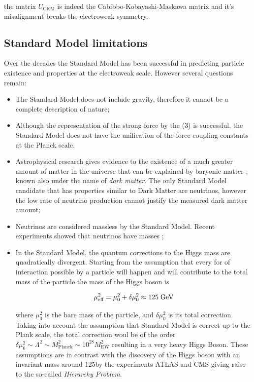the matrix $U_{\text{CKM}}$ is indeed the Cabibbo-Kobayashi-Maskawa matrix and it's misalignment breaks the electroweak symmetry.

\subsection{Standard Model limitations}

Over the decades the Standard Model has been successful in predicting particle existence and properties at the electroweak scale. However several questions remain:

\begin{itemize}
	\item The Standard Model does not include gravity, therefore it cannot be a complete description of nature;
	\item Although the representation of the strong force by the (3) is successful, the Standard Model does not have the unification of the force coupling constants at the Planck scale.
	\item Astrophysical research gives evidence to the existence of a much greater amount of matter in the universe that can be explained by baryonic matter \cite{deBoer:2005tm}, known also under the name of \textit{dark matter}. The only Standard Model candidate that has properties similar to Dark Matter are neutrinos, however the low rate of neutrino production cannot justify the measured dark matter amount;
	\item Neutrinos are considered massless by the Standard Model. Recent experiments showed that neutrinos have masses \cite{Fukuda:1998mi};
	\item In the Standard Model, the quantum corrections to the Higgs mass are quadratically divergent. Starting from the assumption that every for of interaction possible by a particle will happen and will contribute to the total mass of the particle the mass of the Higgs boson is 
	
	\begin{equation}
	\mu^{2}_{\text{eff}} = \mu^{2}_{0} + \delta\mu^{2}_{0} \approx 125\;\text{Ge}\kern-0.06667em\text{V}
	\end{equation}
	
	where $\mu^{2}_{0}$ is the bare mass of the particle, and $\delta\mu^{2}_{0} $ is its total correction. Taking into account the assumption that Standard Model is correct up to the Plank scale, the total correction woul be of the order  $\delta\mu^{2}_{0}  \sim \Lambda^{2} \sim M^{2}_{\text{Planck}} \sim 10^{28}M^{2}_{\text{EW}}$ resulting in a very heavy Higgs Boson. These assumptions are in contrast with the discovery of the Higgs boson with an invariant mass around 125\gev by the experiments ATLAS \cite{Aad:2012tfa} and CMS \cite{Chatrchyan:2012xdj} giving raise to the so-called \textit{Hierarchy Problem}.
	
\end{itemize}

